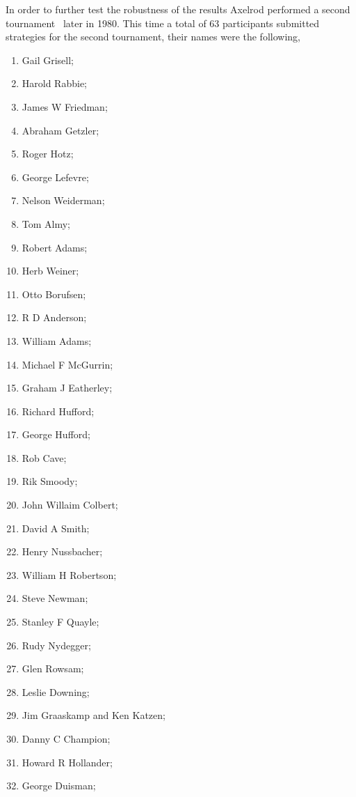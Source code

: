 \documentclass{article}
\begin{document}
In order to further test the robustness of the results Axelrod performed a second
tournament~\cite{Axelrod1980b} later in 1980. This time a total of 63 participants
submitted strategies for the second tournament, their names were the following,

\begin{multicols}{3}
    \begin{enumerate}
        \item Gail Grisell;
        \item Harold Rabbie;
        \item James W Friedman;
        \item Abraham Getzler;
        \item Roger Hotz;
        \item George Lefevre;
        \item Nelson Weiderman;
        \item Tom Almy;
        \item Robert Adams;
        \item Herb Weiner;
        \item Otto Borufsen;
        \item R D Anderson;
        \item William Adams;
        \item Michael F McGurrin;
        \item Graham J Eatherley;
        \item Richard Hufford;
        \item George Hufford;
        \item Rob Cave;
        \item Rik Smoody;
        \item John Willaim Colbert;
        \item David A Smith;
        \item Henry Nussbacher;
        \item William H Robertson;
        \item Steve Newman;
        \item Stanley F Quayle;
        \item Rudy Nydegger;
        \item Glen Rowsam;
        \item Leslie Downing;
        \item Jim Graaskamp and Ken Katzen;
        \item Danny C Champion;
        \item Howard R Hollander;
        \item George Duisman;

\end{enumerate}
\end{multicols}
\end{document}

